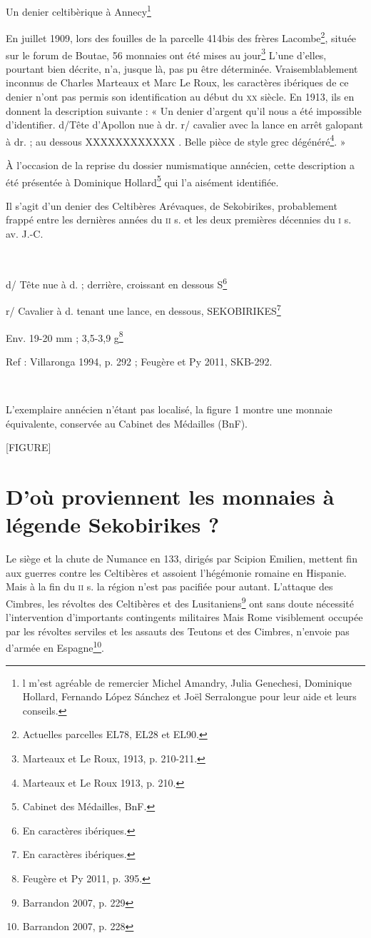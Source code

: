 
Un denier celtibèrique à Annecy\footnote{l m’est agréable de remercier Michel Amandry, Julia Genechesi,
 Dominique Hollard, Fernando López Sánchez et Joël
  Serralongue pour leur aide et leurs conseils.}


En juillet 1909, lors des fouilles de la parcelle 414bis des frères 
Lacombe\footnote{Actuelles parcelles EL78, EL28 et EL90.}, située sur le forum de
 Boutae, 56 monnaies ont été mises au jour\footnote{Marteaux et Le Roux, 1913, p. 210-211.}
L’une d’elles, pourtant bien décrite, n’a, jusque là, pas pu être déterminée. 
Vraisemblablement inconnus de Charles Marteaux et Marc Le Roux, les caractères ibériques
 de ce denier n’ont pas permis son identification au début du \textsc{xx} siècle.
 En 1913, ils en donnent la description suivante : « Un denier
 d’argent qu’il nous a été impossible d’identifier. d/Tête d’Apollon nue à dr.
 r/ cavalier avec la lance en arrêt galopant à dr. ; au dessous XXXXXXXXXXXX . Belle
 pièce de style grec dégénéré\footnote{Marteaux et Le Roux 1913, p. 210.}. »

À l’occasion de la reprise du dossier numismatique annécien, cette description
 a été présentée à Dominique Hollard\footnote{Cabinet des Médailles, BnF.} qui l’a aisément identifiée.

Il s’agit d’un denier des Celtibères Arévaques, de Sekobirikes, probablement frappé entre les dernières années du
\textsc{ii} s. et les deux premières décennies du \textsc{i} s. av. J.-C.

~

d/ Tête nue à d. ; derrière, croissant en dessous S\footnote{En caractères ibériques.}

r/ Cavalier à d. tenant une lance, en dessous, SEKOBIRIKES\footnote{En caractères ibériques.}

Env. 19-20 mm ; 3,5-3,9 g\footnote{Feugère et Py 2011, p. 395.}

Ref : Villaronga 1994, p. 292 ; Feugère et Py 2011, SKB-292.

~

L’exemplaire annécien n’étant pas localisé, la figure 1 montre une monnaie
équivalente, conservée au Cabinet des Médailles (BnF).

[FIGURE]

\section{D’où proviennent les monnaies à légende Sekobirikes ?}

Le siège et la chute de Numance en 133, dirigés par Scipion Emilien, mettent fin aux guerres contre 
les Celtibères et assoient l’hégémonie romaine en Hispanie. Mais à la 
fin du \textsc{ii} s. la région n’est pas pacifiée pour autant.
L’attaque des Cimbres, les révoltes des Celtibères et des Lusitaniens\footnote{Barrandon 2007, p. 229} ont
sans doute nécessité l’intervention d’importants contingents militaires	
Mais Rome visiblement occupée par les révoltes serviles et les assauts des Teutons
et des Cimbres, n’envoie pas d’armée en Espagne\footnote{Barrandon 2007, p. 228}.

